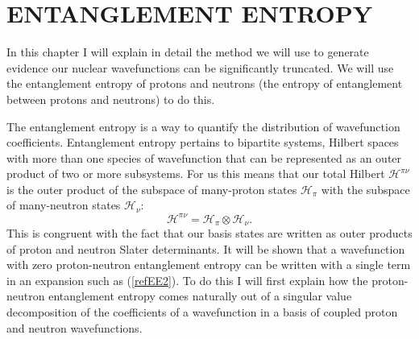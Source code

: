 \chapter{ENTANGLEMENT ENTROPY}
\label{chap:coupling}


In this chapter I will explain in detail the method we will use to generate 
evidence our nuclear wavefunctions can be 
significantly truncated. We will use the entanglement entropy of protons and
neutrons (the entropy of entanglement between protons and neutrons) to do this.

The entanglement entropy is a way to quantify the distribution of wavefunction
coefficients. Entanglement entropy pertains to bipartite systems, Hilbert spaces
with more than one species of wavefunction that can be represented as an outer product
of two or more subsystems. For us this means that our total Hilbert $\mathcal{H}^{\pi\nu}$ is the 
outer product of the subspace of many-proton states $\mathcal{H}_\pi$ with the
subspace of many-neutron states $\mathcal{H}_\nu$:
\begin{equation}
    \mathcal{H}^{\pi\nu} = \mathcal{H}_\pi\otimes\mathcal{H}_\nu.
\end{equation}
This is congruent with the fact that our basis states are written as outer products 
of proton and neutron Slater determinants. 
It will be shown that a wavefunction with zero proton-neutron entanglement entropy
can be written with a single term in an expansion such as (\ref{refEE2}). To 
do this I will first explain how the proton-neutron entanglement entropy comes
naturally out of a singular value decomposition of the coefficients 
of a wavefunction in a basis of coupled proton and neutron wavefunctions.

